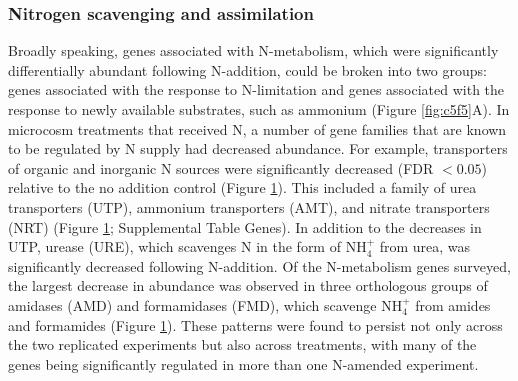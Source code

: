 \begin{figure}[p!]
  \label{fig:c5f4}
\end{figure}

\subsubsection{Nitrogen scavenging and assimilation}

Broadly speaking, genes associated with N-metabolism, which were significantly differentially abundant following N-addition, could be broken into two groups: genes associated with the response to N-limitation and genes associated with the response to newly available substrates, such as ammonium (Figure \ref{fig:c5f5}A). In microcosm treatments that received N, a number of gene families that are known to be regulated by N supply had decreased abundance.  For example, transporters of organic and inorganic N sources were significantly decreased (FDR $< 0.05$) relative to the no addition control (Figure \ref{fig:c5f4}). This included a family of urea transporters (UTP), ammonium transporters (AMT), and nitrate transporters (NRT) (Figure \ref{fig:c5f4}; Supplemental Table Genes). In addition to the decreases in UTP, urease (URE), which scavenges N in the form of NH$_{4}^+$ from urea, was significantly decreased following N-addition. Of the N-metabolism genes surveyed, the largest decrease in abundance was observed in three orthologous groups of amidases (AMD) and formamidases (FMD), which scavenge NH$_{4}^+$ from amides and formamides (Figure \ref{fig:c5f4}). These patterns were found to persist not only across the two replicated experiments but also across treatments, with many of the genes being significantly regulated in more than one N-amended experiment. \par

